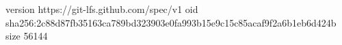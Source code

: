 version https://git-lfs.github.com/spec/v1
oid sha256:2c88d87fb35163ca789bd323903e0fa993b15e9c15c85acaf9f2a6b1eb6d424b
size 56144

